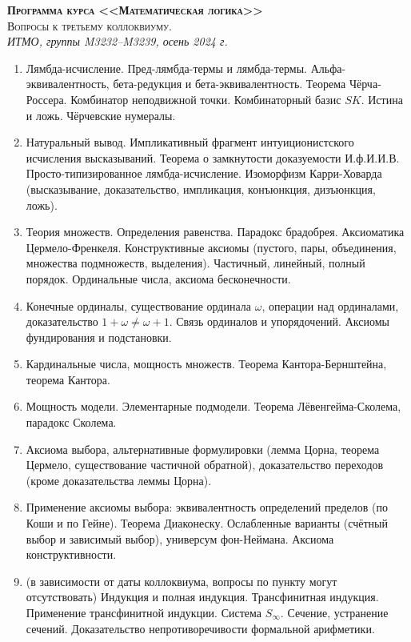 \documentclass[11pt,a4paper,oneside]{scrartcl}
\begin{document}
\pagestyle{empty}

\begin{center}
{\large\scshape\bfseries Программа курса <<Математическая логика>>}\\
{\large\scshape Вопросы к третьему коллоквиуму.}\\
\itshape ИТМО, группы M3232--M3239, осень 2024 г.
\end{center}


\begin{enumerate}
\item Лямбда-исчисление. Пред-лямбда-термы и лямбда-термы. Альфа-эквивалентность, бета-редукция
и бета-эквивалентность. Теорема Чёрча-Россера. 
Комбинатор неподвижной точки. Комбинаторный базис $SK$.
Истина и ложь. Чёрчевские нумералы. 
\item Натуральный вывод. Импликативный фрагмент интуиционистского исчисления высказываний.
Теорема о замкнутости доказуемости И.ф.И.И.В.
Просто-типизированное лямбда-исчисление. Изоморфизм Карри-Ховарда 
(высказывание, доказательство, импликация, конъюнкция, дизъюнкция, ложь). 
\item Теория множеств. Определения равенства. Парадокс брадобрея. Аксиоматика Цермело-Френкеля. 
Конструктивные аксиомы
(пустого, пары, объединения, множества подмножеств, выделения).
Частичный, линейный, полный порядок. Ординальные числа, аксиома бесконечности. 
\item Конечные ординалы, существование ординала $\omega$, операции над ординалами, 
доказательство $1+\omega\ne\omega+1$. Связь ординалов и упорядочений. Аксиомы фундирования и подстановки.
\item Кардинальные числа, мощность множеств. Теорема Кантора-Бернштейна, теорема Кантора. 
\item Мощность модели. Элементарные подмодели. Теорема Лёвенгейма-Сколема, парадокс Сколема.
\item Аксиома выбора, альтернативные формулировки (лемма Цорна, теорема Цермело, существование
частичной обратной), доказательство переходов (кроме доказательства леммы Цорна).
\item Применение аксиомы выбора: эквивалентность определений пределов (по Коши и по Гейне).
Теорема Диаконеску. Ослабленные варианты (счётный выбор и зависимый выбор), универсум фон-Неймана.
Аксиома конструктивности.
\item 
(в зависимости от даты коллоквиума, вопросы по пункту могут отсутствовать)
Индукция и полная индукция. Трансфинитная индукция. Применение трансфинитной индукции.
Система $S_\infty$. 
Сечение, устранение сечений. Доказательство непротиворечивости формальной арифметики.
\end{enumerate}
\end{document}
